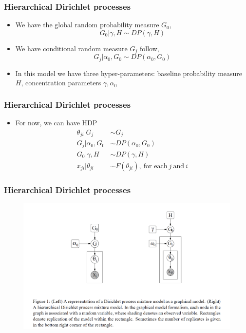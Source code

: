 \documentclass{beamer}
\begin{document}
\begin{frame}
    \frametitle{Hierarchical Dirichlet processes}
    \begin{itemize}
        \item We have the global random probability measure $G_0$,
$$G_0|\gamma, H\sim DP(\gamma, H)$$
        \item We have conditional random measure $G_j$ follow,
$$G_j|\alpha_0, G_0\sim DP(\alpha_0, G_0)$$
        \item In this model we have three hyper-parameters: baseline probability measure $H$, concentration parameters $\gamma,\alpha_0$
    \end{itemize}
\end{frame}
\begin{frame}
    \frametitle{Hierarchical Dirichlet processes}
    \begin{itemize}
        \item For now, we can have HDP
$$\begin{aligned}\theta_{ji}|G_j &\sim G_j\\
G_j|\alpha_0, G_0&\sim DP(\alpha_0, G_0)\\
G_0|\gamma,H &\sim DP(\gamma,H)\\
x_{ji}|\theta_{ji}&\sim F(\theta_{ji}),\ \text{for each}\ j\ \text{and}\ i
\end{aligned}$$
    \end{itemize}
\end{frame}
\begin{frame}
    \frametitle{Hierarchical Dirichlet processes}
    \begin{figure}[H] 
    \centering
    \includegraphics[width=1\textwidth]{pic/2023-05-16 185113.png} 
    \caption{} 
    \label{Fig1} 
    \end{figure}
\end{frame}
\end{document}
